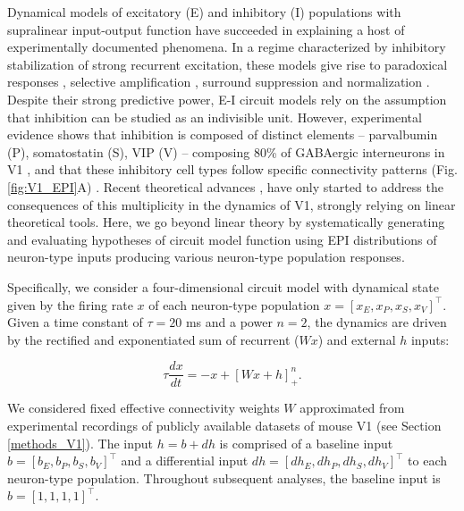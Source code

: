 \documentclass[11pt]{article}
\begin{document}
Dynamical models of excitatory (E) and inhibitory (I) populations with supralinear input-output function have succeeded in explaining a host of experimentally documented phenomena.
In a regime characterized by inhibitory stabilization of strong recurrent excitation, these models give rise to paradoxical responses \cite{tsodyks1997paradoxical}, selective amplification  \cite{murphy2009balanced}, surround suppression \cite{ozeki2009inhibitory} and normalization \cite{rubin2015stabilized}. 
Despite their strong predictive power, E-I circuit models rely on the assumption that inhibition can be studied as an indivisible unit. 
However, experimental evidence shows that inhibition is composed of distinct elements -- parvalbumin (P), somatostatin (S), VIP (V) --
composing 80\% of GABAergic interneurons in V1 \cite{markram2004interneurons, rudy2011three, tremblay2016}, and that these inhibitory cell types follow specific connectivity patterns (Fig. \ref{fig:V1_EPI}A) \cite{pfeffer2013inhibition}.
Recent theoretical advances \cite{litwin2016inhibitory, GarciaDelMolino2017, Chen2019},  have only started to address the consequences of this multiplicity in the dynamics of V1, strongly relying on linear theoretical tools. 
Here, we go beyond linear theory by systematically generating and evaluating hypotheses of circuit model function using EPI distributions of neuron-type inputs producing various neuron-type population responses.

Specifically, we consider a four-dimensional circuit model with dynamical state given by the firing rate $x$ of each neuron-type population $x = \left[x_E, x_P , x_S, x_V \right]^\top$. Given a time constant of $\tau = 20$ ms and a power $n = 2$, the dynamics are driven by the rectified and exponentiated sum of recurrent ($Wx$) and external $h$ inputs:

\begin{equation}
\tau \frac{dx}{dt} = -x + [W x+ h]_+^n.
\end{equation}

We considered fixed effective connectivity weights $W$ approximated from experimental recordings of publicly available datasets of mouse V1 \cite{allen2018layer, billeh2019systematic} (see Section \ref{methods_V1}).
The input $h = b + dh$ is comprised of a baseline input  $b = \left[ b_E, b_P , b_S , b_V \right]^\top$ and a differential input $dh = \left[ dh_E , dh_P , dh_S , dh_V\right]^\top$ to each neuron-type population.  
Throughout subsequent analyses, the baseline input is $b = \left[ 1 ,1,1,1\right]^\top$. 
\end{document}
